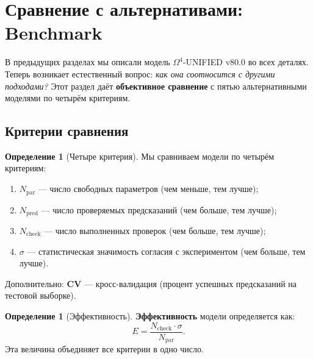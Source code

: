 \documentclass[11pt,a4paper]{article}
\newcommand{\Om}{\Omega^4}
\theoremstyle{definition}
\newtheorem{definition}[theorem]{Определение}
\begin{document}
\vspace{1cm}

\newpage

\section{Сравнение с альтернативами: Benchmark}
\label{sec:benchmark}

В предыдущих разделах мы описали модель $\Om$-UNIFIED v80.0 
во всех деталях. Теперь возникает естественный вопрос: 
\emph{как она соотносится с другими подходами?} Этот раздел 
даёт \textbf{объективное сравнение} с пятью альтернативными 
моделями по четырём критериям.

\subsection{Критерии сравнения}
\label{subsec:benchmark-criteria}

\begin{definition}[Четыре критерия]
\label{def:four-criteria}
Мы сравниваем модели по четырём критериям:
\begin{enumerate}
    \item \textbf{$N_{\text{par}}$} — число свободных параметров 
          (чем меньше, тем лучше);
    \item \textbf{$N_{\text{pred}}$} — число проверяемых 
          предсказаний (чем больше, тем лучше);
    \item \textbf{$N_{\text{check}}$} — число выполненных 
          проверок (чем больше, тем лучше);
    \item \textbf{$\sigma$} — статистическая значимость 
          согласия с экспериментом (чем больше, тем лучше).
\end{enumerate}
Дополнительно: \textbf{CV} — кросс-валидация (процент 
успешных предсказаний на тестовой выборке).
\end{definition}

\begin{definition}[Эффективность]
\label{def:efficiency}
\textbf{Эффективность} модели определяется как:
\begin{equation}
    \boxed{
    E = \frac{N_{\text{check}} \cdot \sigma}{N_{\text{par}}}.
    }
    \label{eq:efficiency}
\end{equation}
Эта величина объединяет все критерии в одно число.
\end{definition}
\end{document}
